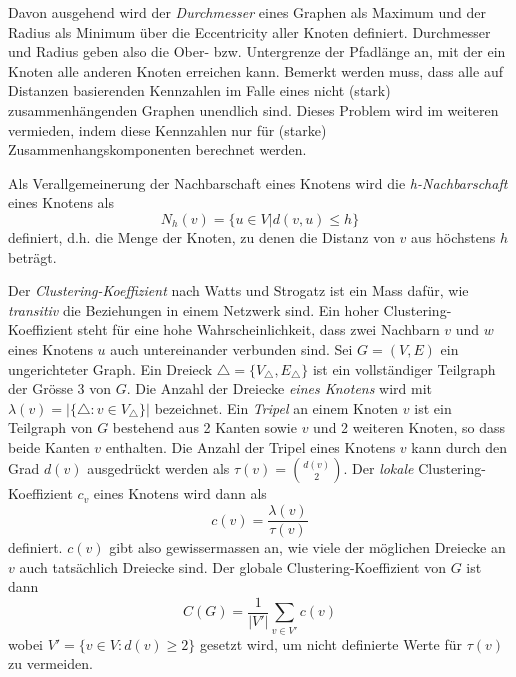 Davon ausgehend  wird der \emph{Durchmesser} eines Graphen als Maximum
und der Radius als Minimum \"uber die Eccentricity aller Knoten
definiert. Durchmesser und Radius geben also die Ober-
bzw. Untergrenze der Pfadl\"ange an, mit der ein Knoten alle anderen
Knoten erreichen kann. Bemerkt werden muss, dass alle auf Distanzen
basierenden Kennzahlen im Falle eines nicht (stark)
zusammenh\"angenden Graphen unendlich sind. Dieses Problem wird im
weiteren vermieden, indem diese Kennzahlen nur f\"ur (starke)
Zusammenhangskomponenten berechnet werden.

Als Verallgemeinerung der Nachbarschaft eines Knotens wird die
\emph{h-Nachbarschaft} eines Knotens als
\begin{equation}
  \label{eq:4}
  N_h(v) = \{ u \in V | d(v, u) \le h \}
\end{equation}
definiert, d.h. die Menge der Knoten, zu denen die Distanz von $v$ aus
h\"ochstens $h$ betr\"agt.

Der \emph{Clustering-Koeffizient} nach Watts und Strogatz ist ein Mass
daf\"ur, wie \emph{transitiv} die Beziehungen in einem Netzwerk
sind. Ein hoher Clustering-Koeffizient steht f\"ur eine hohe
Wahrscheinlichkeit, dass zwei Nachbarn $v$ und $w$ eines Knotens $u$
auch untereinander verbunden sind. Sei $G = (V, E)$ ein ungerichteter
Graph. Ein Dreieck $\bigtriangleup = \{V_{\bigtriangleup},
E_{\bigtriangleup}\}$ ist ein vollst\"andiger Teilgraph der Gr\"osse 3
von $G$. Die Anzahl der Dreiecke \emph{eines Knotens} wird mit
$\lambda(v) = |\{\bigtriangleup : v \in V_{\bigtriangleup}\}|$
bezeichnet. Ein \emph{Tripel} an einem Knoten $v$ ist ein Teilgraph
von $G$ bestehend aus 2 Kanten sowie $v$ und 2 weiteren Knoten, so
dass beide Kanten $v$ enthalten. Die Anzahl der Tripel eines Knotens
$v$ kann durch den Grad $d(v)$ ausgedr\"uckt werden als
$\tau(v)=\binom{d(v)}{2}$. Der \emph{lokale} Clustering-Koeffizient
$c_v$ eines Knotens wird dann als
\begin{equation}
  \label{eq:5}
  c(v) = \frac{\lambda(v)}{\tau(v)}
\end{equation}
definiert. $c(v)$ gibt also gewissermassen an, wie viele der
m\"oglichen Dreiecke an $v$ auch tats\"achlich Dreiecke sind. Der
globale Clustering-Koeffizient von $G$ ist dann
\begin{equation}
  \label{eq:6}
  C(G) = \frac{1}{|V'|} \sum_{v \in V'}c(v)
\end{equation}
wobei $V' = \{v \in V : d(v) \ge 2\}$ gesetzt wird, um nicht
definierte Werte f\"ur $\tau(v)$ zu vermeiden.

